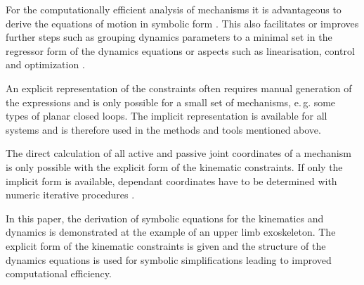 \documentclass[letterpaper, 10 pt, conference]{ieeeconf}  %
\begin{document}
For the computationally efficient analysis of mechanisms it is advantageous to derive the equations of motion in symbolic form \cite{SaminFis2013}.
This also facilitates or improves further steps such as grouping dynamics parameters to a minimal set  in the regressor form of the dynamics equations \cite{KhalilBen1995} or aspects such as linearisation, control and optimization \cite{ParkChoPlo1999}.


An explicit representation of the constraints often requires manual generation of the expressions and is only possible for a small set of mechanisms, e.\,g. some types of planar closed loops.
The implicit representation is available for all systems and is therefore used in the methods and tools mentioned above.


The direct calculation of all active and passive joint coordinates of a mechanism is only possible with the explicit form of the kinematic constraints.
If only the implicit form is available, dependant coordinates have to be determined with numeric iterative procedures \cite{ParkChoPlo1999}.

In this paper, the derivation of symbolic equations for the kinematics and dynamics is demonstrated at the example of an upper limb exoskeleton.
The explicit form of the kinematic constraints is given and the structure of the dynamics equations is used for symbolic simplifications leading to improved computational efficiency.
\end{document}
